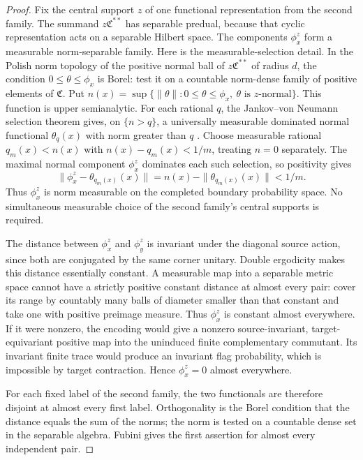 \begin{proof}
Fix the central support $z$ of one functional representation from the
second family. The summand $z\mathfrak C^{**}$ has separable predual,
because that cyclic representation acts on a separable Hilbert space.
The components $\phi_x^z$ form a measurable norm-separable family.
Here is the measurable-selection detail. In the Polish norm topology
of the positive normal ball of $z\mathfrak C^{**}$ of radius $d$,
the condition $0\leq\theta\leq\phi_x$ is Borel: test it on a
countable norm-dense family of positive elements of $\mathfrak C$.
Put $n(x)=\sup\{\|\theta\|:0\leq\theta\leq\phi_x,
\ \theta\text{ is }z\text{-normal}\}$. This function is upper
semianalytic. For each rational $q$, the Jankov--von Neumann selection
theorem gives, on $\{n>q\}$, a universally measurable dominated
normal functional $\theta_q(x)$ with norm greater than $q$
\cite{Kechris1995}. Choose measurable rational
$q_m(x)<n(x)$ with $n(x)-q_m(x)<1/m$, treating $n=0$ separately.
The maximal normal component $\phi_x^z$ dominates each such selection,
so positivity gives
\[
 \|\phi_x^z-\theta_{q_m(x)}(x)\|
 =n(x)-\|\theta_{q_m(x)}(x)\|<1/m.
\]
Thus $\phi_x^z$ is norm measurable on the completed boundary
probability space. No simultaneous measurable choice of the second
family's central supports is required.

The distance between $\phi_x^z$ and $\phi_y^z$ is invariant under the
diagonal source action, since both are conjugated by the same corner
unitary. Double ergodicity makes this distance essentially constant.
A measurable map into a separable metric space cannot have a strictly
positive constant distance at almost every pair: cover its range by
countably many balls of diameter smaller than that constant and take
one with positive preimage measure. Thus $\phi_x^z$ is constant almost
everywhere. If it were nonzero, the encoding would give a nonzero
source-invariant, target-equivariant positive map into the uninduced
finite complementary commutant. Its invariant finite trace would
produce an invariant flag probability, which is impossible by target
contraction. Hence $\phi_x^z=0$ almost everywhere.

For each fixed label of the second family, the two functionals are
therefore disjoint at almost every first label. Orthogonality is the
Borel condition that the distance equals the sum of the norms; the
norm is tested on a countable dense set in the separable algebra.
Fubini gives the first assertion for almost every independent pair.


\end{proof}
